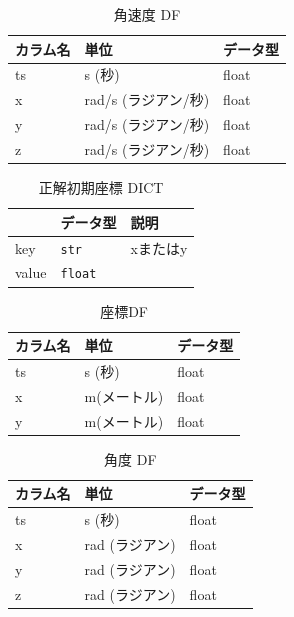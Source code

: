 \begin{table}[ht]
	\centering
	\begin{tabular}{lll}
		\toprule
		カラム名 & 単位             & データ型  \\
		\midrule
		ts   & s (秒)          & float \\
		x    & rad/s (ラジアン/秒) & float \\
		y    & rad/s (ラジアン/秒) & float \\
		z    & rad/s (ラジアン/秒) & float \\
		\bottomrule
	\end{tabular}              
	\caption{角速度 DF}
\end{table}


\begin{table}[ht]
	\centering
	\label{tab:first-coord-dict}
	\begin{tabular}{lll}
		\hline
		      & {データ型}         & {説明}          \\ \hline
		key   & \texttt{str}   & xまたはy         \\ \hline
		value & \texttt{float} & \makecell{座標} \\ \hline
	\end{tabular}
	\caption{正解初期座標 DICT}
\end{table}


\begin{table}[ht]
	\centering
	\begin{tabular}{lll}
		\toprule
		カラム名 & 単位      & データ型  \\
		\midrule
		ts   & s (秒)   & float \\
		x    & m(メートル) & float \\
		y    & m(メートル) & float \\
		\bottomrule
	\end{tabular}
	\caption{座標DF}
\end{table}


\begin{table}[ht]
	\centering
	\begin{tabular}{lll}
		\toprule
		カラム名 & 単位         & データ型  \\
		\midrule
		ts   & s (秒)      & float \\
		x    & rad (ラジアン) & float \\
		y    & rad (ラジアン) & float \\
		z    & rad (ラジアン) & float \\
		\bottomrule
	\end{tabular}
	\caption{角度 DF}
\end{table}

